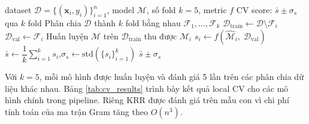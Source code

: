 
\begin{algorithm}[H]
\caption{K-Fold Cross-Validation}
\begin{algorithmic}[1]
\Require dataset $\mathcal{D} = \{(\mathbf{x}_i, y_i)\}_{i=1}^n$, model $\mathcal{M}$, số fold $k = 5$, metric $f$
\Ensure CV score: $\bar{s} \pm \sigma_s$ qua $k$ fold
\State Phân chia $\mathcal{D}$ thành $k$ fold bằng nhau $\mathcal{F}_1, \ldots, \mathcal{F}_k$
    \State $\mathcal{D}_{\text{train}} \leftarrow \mathcal{D} \setminus \mathcal{F}_i$ 
    \State $\mathcal{D}_{\text{val}} \leftarrow \mathcal{F}_i$ 
    \State Huấn luyện $\mathcal{M}$ trên $\mathcal{D}_{\text{train}}$ thu được $\hat{\mathcal{M}}_i$
    \State $s_i \leftarrow f\!\left(\hat{\mathcal{M}}_i,\; \mathcal{D}_{\text{val}}\right)$ 
\EndFor
\State $\bar{s} \leftarrow \dfrac{1}{k}\displaystyle\sum_{i=1}^k s_i$,\quad $\sigma_s \leftarrow \mathrm{std}\!\left(\{s_i\}_{i=1}^k\right)$
\State \Return $\bar{s} \pm \sigma_s$
\end{algorithmic}
\end{algorithm}

Với $k = 5$, mỗi mô hình được huấn luyện và đánh giá 5 lần trên các phân chia dữ liệu khác nhau. Bảng \ref{tab:cv_results} trình bày kết quả local CV cho các mô hình chính trong pipeline. Riêng KRR được đánh giá trên mẫu con vì chi phí tính toán của ma trận Gram tăng theo $O(n^3)$.

